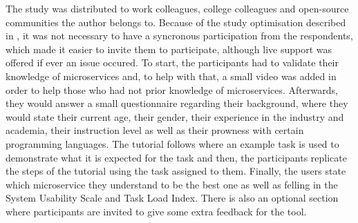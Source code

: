 The study was distributed to work colleagues, college colleagues and open-source communities the author belongs to. Because of the study optimisation described in , it was not necessary to have a syncronous participation from the respondents, which made it easier to invite them to participate, although live support was offered if ever an issue occured.
To start, the participants had to validate their knowledge of microservices and, to help with that, a small video was added in order to help those who had not prior knowledge of microservices. Afterwards, they would answer a small questionnaire regarding their background, where they would state their current age, their gender, their experience in the industry and academia, their instruction level as well as their prowness with certain programming languages. The tutorial follows where an example task is used to demonstrate what it is expected for the task and then, the participants replicate the steps of the tutorial using the task assigned to them. Finally, the users state which microservice they understand to be the best one as well as felling in the System Usability Scale and Task Load Index. There is also an optional section where participants are invited to give some extra feedback for the tool.
